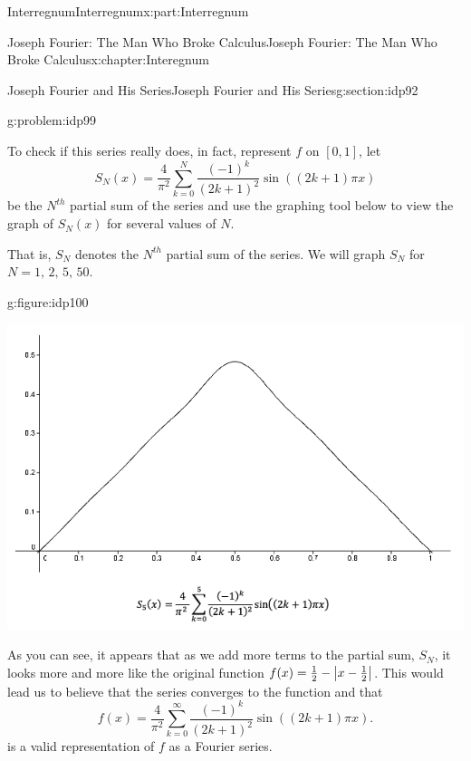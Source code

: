\begin{partptx}{Interregnum}{}{Interregnum}{}{}{x:part:Interregnum}
\begin{chapterptx}{Joseph Fourier: The Man Who Broke Calculus}{}{Joseph Fourier: The Man Who Broke Calculus}{}{}{x:chapter:Interegnum}
\begin{sectionptx}{Joseph Fourier and His Series}{}{Joseph Fourier and His Series}{}{}{g:section:idp92}
\begin{problem}{}{g:problem:idp99}
\begin{equation*}
				\end{equation*}
			\end{problem}
			To check if this series really does, in fact, represent \(f\) on \([0,1]\), let%
			\begin{equation*}
				S_N(x)=\frac{4}{\pi^2}\sum_{k=0}^N\frac{\left(-1\right)^k}{\left(2k+1\right)^2} \sin\left(\left(2k+1\right)\pi x\right)
			\end{equation*}
			be the \(N^{th}\) partial sum of the series and use the graphing tool below to view the graph of \(S_N(x)\) for several values of \(N\).%
			\par
			That is, \(S_N\) denotes the \(N^{th}\) partial sum of the series. We will graph \(S_N\) for \(N=1,\,2,\,5,\,50\).%
			\par
			\begin{figureptx}{}{g:figure:idp100}{}%
				\centering
				\begin{image}{0}{1}{0}%
					\includegraphics[width=\linewidth]{external/images/FourierEx4.png}
				\end{image}%
				\tcblower
			\end{figureptx}%
			As you can see, it appears that as we add more terms to the partial sum, \(S_N\), it looks more and more like the original function \(f(x)=\frac{1}{2}-\left|x-\frac{1}{2}\right|\). This would lead us to believe that the series converges to the function and that%
			\begin{equation}
				f(x)=\frac{4}{\pi^2}\sum_{k=0}^\infty\frac{\left(-1\right)^k}{\left(2k+1\right)^2}\sin\left(\left(2k+1\right)\pi x\right)\text{.}\label{x:men:PDE_sol}
			\end{equation}
			is a valid representation of \(f\) as a Fourier series.%

\end{sectionptx}
\end{chapterptx}
\end{partptx}
